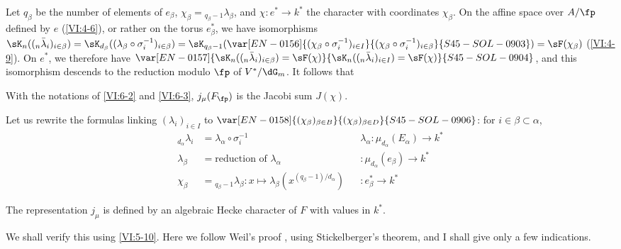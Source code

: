 Let $q_\beta$ be the number of elements of $e_\beta$, 
  $\chi_\beta={}_{q_\beta-1}\lambda_\beta$, and 
$\chi:e^\ast \to k^\ast$ the character with coordinates $\chi_\beta$. On the 
affine space over $A/\fp$ defined by $e$ (\ref{VI:4-6}), or rather on the torus 
$e_\beta^\ast$, we have isomorphisms 
  $\sK_n((_n\bar\lambda_i)_{i\in\beta}) = \sK_{d_\beta}((\lambda_\beta \circ \sigma_i^{-1})_{i\in\beta}) =\sK_{q_\beta-1}(\var[EN-0156]{(\chi_\beta\circ \sigma_i^{-1})_{i\in I}}{(\chi_\beta\circ \sigma_i^{-1})_{i\in\beta}}{S45-SOL-0903}) = \sF(\chi_\beta)$ (\ref{VI:4-9}). 
  On $e^\ast$, we therefore have $\var[EN-0157]{\sK_n((_n\bar\lambda_i)_{i\in \beta}) = \sF(\chi)}{\sK_n((_n\bar\lambda_i)_{i\in I}) = \sF(\chi)}{S45-SOL-0904}$, 
and this isomorphism descends to the reduction modulo $\fp$ of $V^\ast/\dG_m$. 
It follows that





\begin{proposition_}\label{VI:6-4}
With the notations of \ref{VI:6-2} and \ref{VI:6-3}, $j_\mu(F_\fp)$ is the 
Jacobi sum $J(\chi)$. 
\end{proposition_}

Let us rewrite the formulas linking $(\lambda_i)_{i\in I}$ to 
  $\var[EN-0158]{(\chi_\beta)_{\beta\in B}}{(\chi_\beta)_{\beta\in D}}{S45-SOL-0906}$: for $i\in \beta\subset \alpha$, 
\begin{align*}
  _{d_\alpha} \lambda_i &= \lambda_\alpha\circ \sigma_i^{-1} && \lambda_\alpha:\mu_{d_\alpha}(E_\alpha) \to k^\ast \\
  \lambda_\beta &= \text{reduction of $\lambda_\alpha$} && :\mu_{d_\alpha}(e_\beta) \to k^\ast \\
  \chi_\beta &= {}_{q_\beta-1}\lambda_\beta: x\mapsto \lambda_\beta(x^{(q_\beta-1)/d_\alpha}) && :e_\beta^\ast \to k^\ast 
\end{align*}





\begin{theorem_}\label{VI:6-5}
The representation $j_\mu$ is defined by an algebraic Hecke character 
of $F$ with values in $k^\ast$. 
\end{theorem_}

We shall verify this using \ref{VI:5-10}. Here we follow Weil's 
proof , using Stickelberger's theorem, 
and I shall give only a few indications. 





